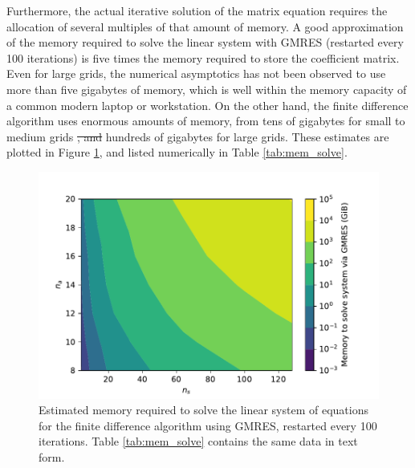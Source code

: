 \documentclass[ms,cpyr,lof,lot]{uathesis}
\providecommand{\DIFadd}[1]{{\protect\color{blue}\uwave{#1}}} %
\providecommand{\DIFdel}[1]{{\protect\color{red}\sout{#1}}}                      %
\providecommand{\DIFaddbegin}{} %
\providecommand{\DIFaddend}{} %
\providecommand{\DIFdelbegin}{} %
\providecommand{\DIFdelend}{} %
\newcommand{\DIFscaledelfig}{0.5}
\newlength{\DIFdelgraphicswidth} %
\newlength{\DIFdelgraphicsheight} %
\newcommand{\DIFaddincludegraphics}[2][]{{\color{blue}\fbox{\DIFOincludegraphics[#1]{#2}}}} %
\newcommand{\DIFdelincludegraphics}[2][]{%
\sbox{\DIFdelgraphicsbox}{\DIFOincludegraphics[#1]{#2}}%
\settoboxwidth{\DIFdelgraphicswidth}{\DIFdelgraphicsbox} %
\settoboxtotalheight{\DIFdelgraphicsheight}{\DIFdelgraphicsbox} %
\scalebox{\DIFscaledelfig}{%
\parbox[b]{\DIFdelgraphicswidth}{\usebox{\DIFdelgraphicsbox}\\[-\baselineskip] \rule{\DIFdelgraphicswidth}{0em}}\llap{\resizebox{\DIFdelgraphicswidth}{\DIFdelgraphicsheight}{%
\setlength{\unitlength}{\DIFdelgraphicswidth}%
\begin{picture}(1,1)%
\thicklines\linethickness{2pt} %
{\color[rgb]{1,0,0}\put(0,0){\framebox(1,1){}}}%
{\color[rgb]{1,0,0}\put(0,0){\line( 1,1){1}}}%
{\color[rgb]{1,0,0}\put(0,1){\line(1,-1){1}}}%
\end{picture}%
}\hspace*{3pt}}} %
} %
\DeclareRobustCommand{\DIFaddbegin}{\DIFOaddbegin \let\includegraphics\DIFaddincludegraphics} %
\DeclareRobustCommand{\DIFaddend}{\DIFOaddend \let\includegraphics\DIFOincludegraphics} %
\DeclareRobustCommand{\DIFdelbegin}{\DIFOdelbegin \let\includegraphics\DIFdelincludegraphics} %
\DeclareRobustCommand{\DIFdelend}{\DIFOaddend \let\includegraphics\DIFOincludegraphics} %
\begin{document}
Furthermore, the actual iterative solution of the matrix equation requires the allocation of several multiples of that amount of memory.
A good approximation of the memory required to solve the linear system with GMRES (restarted every 100 iterations) is five times the memory required to store the coefficient matrix.
Even for large grids, the numerical asymptotics \DIFaddbegin \DIFadd{approach }\DIFaddend has not been observed to use more than five gigabytes of memory, which is well within the memory capacity of a common modern laptop or workstation.
On the other hand, the finite difference algorithm uses enormous amounts of memory, from tens of gigabytes for small to medium grids \DIFdelbegin \DIFdel{, and }\DIFdelend \DIFaddbegin \DIFadd{to }\DIFaddend hundreds of gigabytes for large grids.
These estimates are plotted in Figure \ref{fig:mem_solve}, and listed numerically in Table \ref{tab:mem_solve}.
\begin{figure}[H]
  \centering
  \includegraphics[width=5in]{memory_solve}
  \caption{Estimated memory required to solve the linear system of equations for the finite difference algorithm using GMRES, restarted every 100 iterations. Table \ref{tab:mem_solve} contains the same data in text form.}
  \label{fig:mem_solve}
\end{figure}

\end{document}
